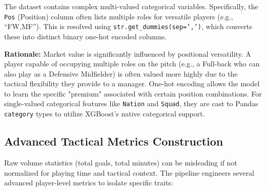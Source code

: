 \documentclass[a4paper,12pt]{report}
\begin{document}
The dataset contains complex multi-valued categorical variables. Specifically, the \texttt{Pos} (Position) column often lists multiple roles for versatile players (e.g., ``FW,MF''). This is resolved using \texttt{str.get\_dummies(sep=',')}, which converts these into distinct binary one-hot encoded columns. 

\textbf{Rationale:} Market value is significantly influenced by positional versatility. A player capable of occupying multiple roles on the pitch (e.g., a Full-back who can also play as a Defensive Midfielder) is often valued more highly due to the tactical flexibility they provide to a manager. One-hot encoding allows the model to learn the specific "premium" associated with certain position combinations. For single-valued categorical features like \texttt{Nation} and \texttt{Squad}, they are cast to Pandas \texttt{category} types to utilize XGBoost's native categorical support.

\subsection{Advanced Tactical Metrics Construction}

Raw volume statistics (total goals, total minutes) can be misleading if not normalized for playing time and tactical context. The pipeline engineers several advanced player-level metrics to isolate specific traits:
\end{document}
